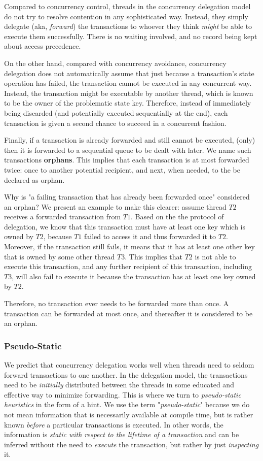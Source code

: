 Compared to concurrency control, threads in the concurrency delegation model do not try to resolve
contention in any sophisticated way. Instead, they simply delegate (aka, \textit{forward}) the
transactions to whoever they think \textit{might} be able to execute them successfully. There is no
waiting involved, and no record being kept about access precedence.

On the other hand, compared with concurrency avoidance, concurrency delegation does not
automatically assume that just because a transaction's state operation has failed, the transaction
cannot be executed in any concurrent way. Instead, the transaction might be executable by another
thread, which is known to be the owner of the problematic state key. Therefore, instead of
immediately being discarded (and potentially executed sequentially at the end), each transaction is
given a second chance to succeed in a concurrent fashion.

Finally, if a transaction is already forwarded and still cannot be executed, (only) then it is
forwarded to a sequential queue to be dealt with later. We name such transactions \textbf{orphans}.
This implies that each transaction is at most forwarded twice: once to another potential recipient,
and next, when needed, to the be declared as orphan.


Why is "a failing transaction that has already been forwarded once" considered an orphan? We
present an example to make this clearer: assume thread $T2$ receives a forwarded transaction from
$T1$. Based on the the protocol of delegation, we know that this transaction must have at least
one key which is owned by $T2$, because $T1$ failed to access it and thus forwarded it to $T2$.
Moreover, if the transaction still fails, it means that it has at least one other key that is
owned by some other thread $T3$. This implies that $T2$ is not able to execute this
transaction, and any further recipient of this transaction, including $T3$, will also fail to
execute it because the transaction has at least one key owned by $T2$.

Therefore, no transaction ever needs to be forwarded more than once. A transaction can be
forwarded at most once, and thereafter it is considered to be an orphan.

\subsubsection{Pseudo-Static}

We predict that concurrency delegation works well when threads need to seldom forward transactions
to one another. In the delegation model, the transactions need to be \textit{initially} distributed between
the threads in some educated and effective way to minimize forwarding. This is where we turn to
\textit{pseudo-static heuristics} in the form of a hint. We use the term "\textit{pseudo-static}"
because we do not mean information that is necessarily available at compile time, but is rather
known \textit{before} a particular transactions is executed. In other words, the information is
\textit{static with respect to the lifetime of a transaction} and can be inferred without the need
to \textit{execute} the transaction, but rather by just \textit{inspecting} it.


